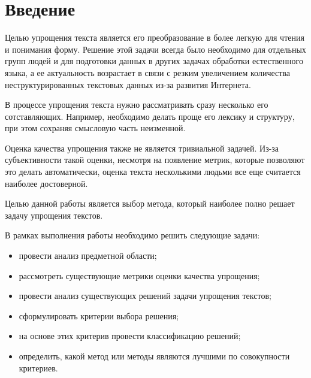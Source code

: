 \chapter*{Введение}

Целью упрощения текста является его преобразование в более легкую для чтения и понимания форму. Решение этой задачи всегда было необходимо для отдельных групп людей\cite{liu_simplification_2016}\cite{evans_evaluation_2014} и для подготовки данных в других задачах обработки естественного языка\cite{finegan_dollak_sentence_2016}, а ее актуальность возрастает в связи с резким увеличением количества неструктурированных текстовых данных из-за развития Интернета.

В процессе упрощения текста нужно рассматривать сразу несколько его сотставляющих. Например, необходимо делать проще его лексику и структуру, при этом сохраняя смысловую часть неизменной.

Оценка качества упрощения также не является тривиальной задачей. Из-за субъективности такой оценки, несмотря на появление метрик, которые позволяют это делать автоматически, оценка текста несколькими людьми все еще считается наиболее достоверной\cite{shardlow_survey_2014}.

Целью данной работы является выбор метода, который наиболее полно решает задачу упрощения текстов.

В рамках выполнения работы необходимо решить следующие задачи: 
\begin{itemize}
	\item провести анализ предметной области;
	\item рассмотреть существующие метрики оценки качества упрощения;
	\item провести анализ существующих решений задачи упрощения текстов;
	\item сформулировать критерии выбора решения;
	\item на основе этих критерив провести классификацию решений;
	\item определить, какой метод или методы являются лучшими по совокупности критериев.
\end{itemize}
